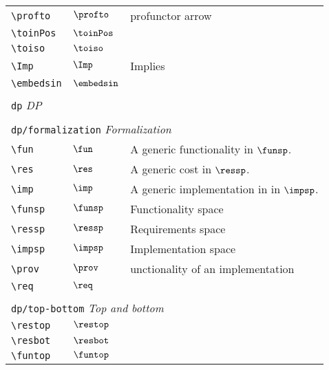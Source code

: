 \begin{longtable}{lll}
 {\color[rgb]{0.5,0.5,0.5}\texttt{\textbackslash profto}} & $\profto$ &  profunctor arrow\\ 
 {\color[rgb]{0.5,0.5,0.5}\texttt{\textbackslash toinPos}} & $\toinPos$ & \\ 
 {\color[rgb]{0.5,0.5,0.5}\texttt{\textbackslash toiso}} & $\toiso$ & \\ 
 {\color[rgb]{0.5,0.5,0.5}\texttt{\textbackslash Imp}} & $\Imp$ &  Implies\\ 
 {\color[rgb]{0.5,0.5,0.5}\texttt{\textbackslash embedsin}} & $\embedsin$ & \\ 
  &  & \\ 
 \multicolumn{3}{l}{{\color[rgb]{0.5,0.5,0.5}\texttt{dp}} \emph{DP}}\\ 
 \hline
\hline
 &  & \\ 
 \multicolumn{3}{l}{{\color[rgb]{0.5,0.5,0.5}\texttt{dp/formalization}} \emph{Formalization}}\\ 
 \hline
{\color[rgb]{0.5,0.5,0.5}\texttt{\textbackslash fun}} & $\fun$ &  A generic functionality in $\funsp$.\\ 
 {\color[rgb]{0.5,0.5,0.5}\texttt{\textbackslash res}} & $\res$ &  A generic cost in $\ressp$.\\ 
 {\color[rgb]{0.5,0.5,0.5}\texttt{\textbackslash imp}} & $\imp$ &  A generic implementation in in $\impsp$.\\ 
 {\color[rgb]{0.5,0.5,0.5}\texttt{\textbackslash funsp}} & $\funsp$ &  Functionality space\\ 
 {\color[rgb]{0.5,0.5,0.5}\texttt{\textbackslash ressp}} & $\ressp$ &  Requirements space\\ 
 {\color[rgb]{0.5,0.5,0.5}\texttt{\textbackslash impsp}} & $\impsp$ &  Implementation space\\ 
 {\color[rgb]{0.5,0.5,0.5}\texttt{\textbackslash prov}} & $\prov$ &  unctionality of an implementation\\ 
 {\color[rgb]{0.5,0.5,0.5}\texttt{\textbackslash req}} & $\req$ & \\ 
  &  & \\ 
 \multicolumn{3}{l}{{\color[rgb]{0.5,0.5,0.5}\texttt{dp/top-bottom}} \emph{Top and bottom}}\\ 
 \hline
{\color[rgb]{0.5,0.5,0.5}\texttt{\textbackslash restop}} & $\restop$ & \\ 
 {\color[rgb]{0.5,0.5,0.5}\texttt{\textbackslash resbot}} & $\resbot$ & \\ 
 {\color[rgb]{0.5,0.5,0.5}\texttt{\textbackslash funtop}} & $\funtop$ & \\ 

\end{longtable}
